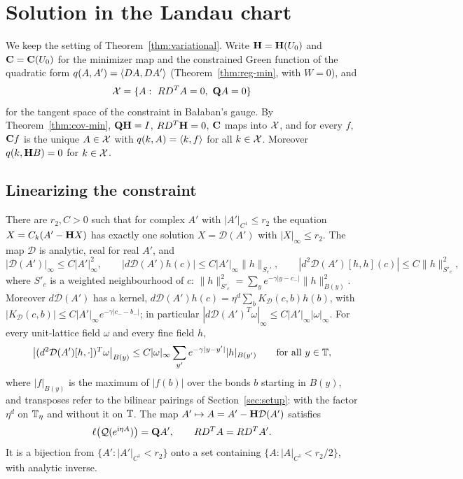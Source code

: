 \section{Solution in the Landau chart}\label{sec:var-solution}

We keep the setting of Theorem~\ref{thm:variational}. Write $\mathbf H=\mathbf H(U_0)$ and $\mathbf C=\mathbf C(U_0)$ for the minimizer map and the constrained Green function of the quadratic form $q(A,A')=\langle D A,D A'\rangle$ (Theorem~\ref{thm:reg-min}, with $W=0$), and
\[
\mathcal X=\{A:\ RD^TA=0,\ \mathbf Q A=0\}
\]
for the tangent space of the constraint in Ba\l aban's gauge. By Theorem~\ref{thm:cov-min}, $\mathbf Q\mathbf H=I$, $RD^T\mathbf H=0$, $\mathbf C$ maps into $\mathcal X$, and for every $f$, $\mathbf C f$ is the unique $A\in\mathcal X$ with $q(k,A)=\langle k,f\rangle$ for all $k\in\mathcal X$. Moreover $q(k,\mathbf H B)=0$ for $k\in\mathcal X$.

\subsection{Linearizing the constraint}

\begin{lemma}\label{lem:linearizing}
There are $r_2,C>0$ such that for complex $A'$ with $|A'|_{C^1}\le r_2$ the equation $X=C_k(A'-\mathbf H X)$ has exactly one solution $X=\mathcal D(A')$ with $|X|_\infty\le r_2$. The map $\mathcal D$ is analytic, real for real $A'$, and
\[
|\mathcal D(A')|_\infty\le C|A'|_\infty^2,\qquad|d\mathcal D(A')h(c)|\le C|A'|_\infty\|h\|_{S_c'},\qquad|d^2\mathcal D(A')[h,h](c)|\le C\|h\|^2_{S'_c},
\]
where $S'_c$ is a weighted neighbourhood of $c$: $\|h\|^2_{S'_c}=\sum_{y}e^{-\gamma|y-c_-|}\|h\|^2_{B(y)}$. Moreover $d\mathcal D(A')$ has a kernel, $d\mathcal D(A')h(c)=\eta^d\sum_bK_{\mathcal D}(c,b)h(b)$, with $|K_{\mathcal D}(c,b)|\le C|A'|_\infty e^{-\gamma|c_--b_-|}$; in particular $|d\mathcal D(A')^T\omega|_\infty\le C|A'|_\infty|\omega|_\infty$. For every unit-lattice field $\omega$ and every fine field $h$,
\begin{equation}\label{eq:d2D-mixed}
\big|(d^2\mathcal D(A')[h,\cdot])^T\omega\big|_{B(y)}\le C|\omega|_\infty\sum_{y'}e^{-\gamma|y-y'|}|h|_{B(y')}\qquad\text{for all }y\in\mathbb T,
\end{equation}
where $|f|_{B(y)}$ is the maximum of $|f(b)|$ over the bonds $b$ starting in $B(y)$, and transposes refer to the bilinear pairings of Section~\ref{sec:setup}: with the factor $\eta^d$ on $\mathbb T_\eta$ and without it on $\mathbb T$. The map $A'\mapsto A=A'-\mathbf H\mathcal D(A')$ satisfies
\[
\ell\big(\mathcal Q(e^{\mathrm i\eta A})\big)=\mathbf Q A',\qquad RD^TA=RD^TA'.
\]
It is a bijection from $\{A':|A'|_{C^1}<r_2\}$ onto a set containing $\{A:|A|_{C^1}<r_2/2\}$, with analytic inverse.
\end{lemma}

